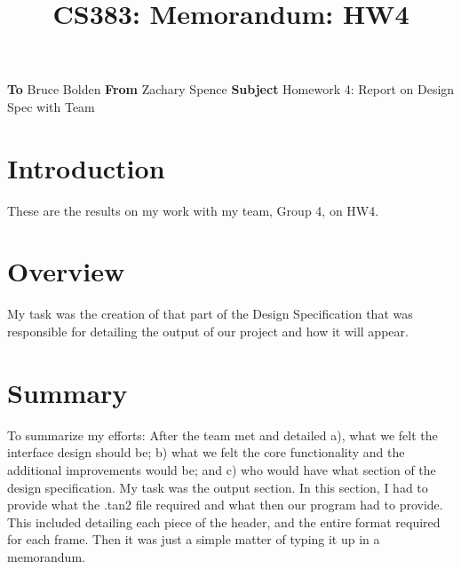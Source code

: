 \documentclass[12pt]{article}
\title{CS383: Memorandum: HW4}
\begin{document}
\maketitle
\noindent \textbf{To}  Bruce Bolden \newline \textbf{From}  Zachary Spence \newline \textbf{Subject}  Homework 4: Report on Design Spec with Team
\section{Introduction}
These are the results on my work with my team, Group 4, on HW4.

\section{Overview}
My task was the creation of that part of the Design Specification that was responsible for detailing the output of our project and how it will appear.

\section{Summary}
To summarize my efforts: After the team met and detailed a), what we felt the interface design should be; b) what we felt the core functionality and the additional improvements would be; and c) who would have what section of the design specification.  My task was the output section.  In this section, I had to provide what the .tan2 file required and what then our program had to provide.  This included detailing each piece of the header, and the entire format required for each frame.  Then it was just a simple matter of typing it up in a memorandum.
\end{document}
